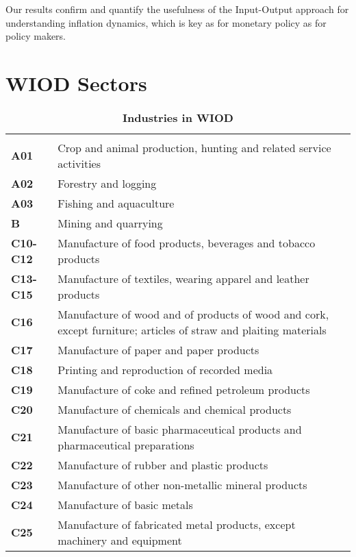 \documentclass[11pt,a4paper]{article}
\begin{document}
Our results confirm and quantify the usefulness of the Input-Output approach for understanding inflation dynamics, which is key as for monetary policy as for policy makers. 



\newpage


\newpage
\appendix
\section{WIOD Sectors}
\begin{table}[!h]
 \centering
 \caption{\footnotesize{\textbf{Industries in WIOD}}}
 \footnotesize
 \begin{tabular}{ll}
  \hline \\
\textbf{A01} &{Crop and animal production, hunting and related service activities}\\
\textbf{A02} &{Forestry and logging}\\
\textbf{A03} &{Fishing and aquaculture}\\
\textbf{B} &{Mining and quarrying}\\
\textbf{C10-C12} &{Manufacture of food products, beverages and tobacco products}\\
\textbf{C13-C15} &{Manufacture of textiles, wearing apparel and leather products}\\
\textbf{C16} &{Manufacture of wood and of products of wood and cork, except furniture; articles of straw and plaiting materials}\\
\textbf{C17} &{Manufacture of paper and paper products}\\
\textbf{C18} &{Printing and reproduction of recorded media}\\
\textbf{C19} &{Manufacture of coke and refined petroleum products}\\
\textbf{C20} &{Manufacture of chemicals and chemical products}\\
\textbf{C21} &{Manufacture of basic pharmaceutical products and pharmaceutical preparations}\\
\textbf{C22} &{Manufacture of rubber and plastic products}\\
\textbf{C23} &{Manufacture of other non-metallic mineral products}\\
\textbf{C24} &{Manufacture of basic metals}\\
\textbf{C25} &{Manufacture of fabricated metal products, except machinery and equipment}\\

\end{tabular}
\end{table}
\end{document}
